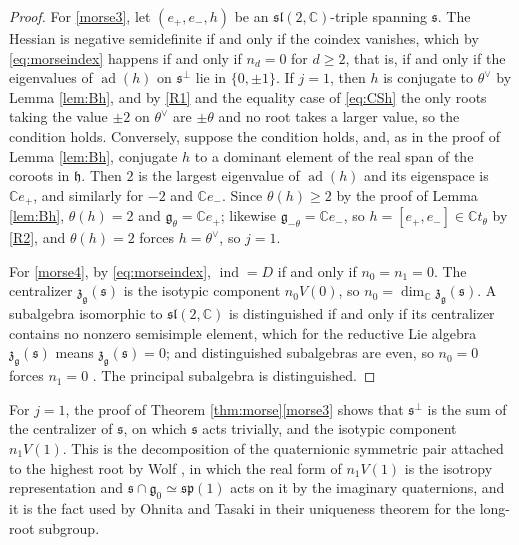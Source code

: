 \documentclass [leqno, 10pt]{amsart}
\theoremstyle{definition}
\numberwithin{equation}{section}
\newcommand{\h}{\mathfrak{h}}
\newcommand{\sll}{\mathfrak{sl}}
\newcommand{\g}{\mathfrak{g}}
\newcommand{\ad}{\operatorname{ad}}
\newcommand{\com}{\mathbb C}
\newcommand{\gz}{\g_{0}}
\newcommand{\subs}{\mathfrak{s}}
\begin{document}
\begin{proof}
For \ref{morse3}, let $(e_{+}, e_{-}, h)$ be an $\sll(2, \com)$-triple spanning $\subs$. The Hessian is negative semidefinite if and only if the coindex vanishes, which by \eqref{eq:morseindex} happens if and only if $n_{d} = 0$ for $d \geq 2$, that is, if and only if the eigenvalues of $\ad(h)$ on $\subs^{\perp}$ lie in $\{0, \pm 1\}$. If $j = 1$, then $h$ is conjugate to $\theta^{\vee}$ by Lemma \ref{lem:Bh}, and by \ref{R1} and the equality case of \eqref{eq:CSh} the only roots taking the value $\pm 2$ on $\theta^{\vee}$ are $\pm\theta$ and no root takes a larger value, so the condition holds. Conversely, suppose the condition holds, and, as in the proof of Lemma \ref{lem:Bh}, conjugate $h$ to a dominant element of the real span of the coroots in $\h$. Then $2$ is the largest eigenvalue of $\ad(h)$ and its eigenspace is $\com e_{+}$, and similarly for $-2$ and $\com e_{-}$. Since $\theta(h) \geq 2$ by the proof of Lemma \ref{lem:Bh}, $\theta(h) = 2$ and $\g_{\theta} = \com e_{+}$; likewise $\g_{-\theta} = \com e_{-}$, so $h = [e_{+}, e_{-}] \in \com t_{\theta}$ by \ref{R2}, and $\theta(h) = 2$ forces $h = \theta^{\vee}$, so $j = 1$.

For \ref{morse4}, by \eqref{eq:morseindex}, $\operatorname{ind} = D$ if and only if $n_{0} = n_{1} = 0$. The centralizer $\mathfrak{z}_{\g}(\subs)$ is the isotypic component $n_{0}V(0)$, so $n_{0} = \dim_{\com}\mathfrak{z}_{\g}(\subs)$. A subalgebra isomorphic to $\sll(2, \com)$ is distinguished if and only if its centralizer contains no nonzero semisimple element, which for the reductive Lie algebra $\mathfrak{z}_{\g}(\subs)$ means $\mathfrak{z}_{\g}(\subs) = 0$; and distinguished subalgebras are even, so $n_{0} = 0$ forces $n_{1} = 0$ \cite[Section~8.2]{Collingwood-McGovern}. The principal subalgebra is distinguished.
\end{proof}

\begin{remark}\label{rem:wolf}
For $j = 1$, the proof of Theorem \ref{thm:morse}\ref{morse3} shows that $\subs^{\perp}$ is the sum of the centralizer of $\subs$, on which $\subs$ acts trivially, and the isotypic component $n_{1}V(1)$. This is the decomposition of the quaternionic symmetric pair attached to the highest root by Wolf \cite{Wolf-quaternionic}, in which the real form of $n_{1}V(1)$ is the isotropy representation and $\subs \cap \gz \simeq \mathfrak{sp}(1)$ acts on it by the imaginary quaternions, and it is the fact used by Ohnita and Tasaki \cite[(8)]{Ohnita-Tasaki} in their uniqueness theorem for the long-root subgroup.
\end{remark}
\end{document}
